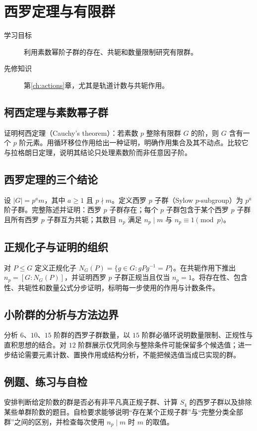 \setcounter{chapter}{6} %
\chapter{西罗定理与有限群}\label{ch:sylow}

\begin{description}
  \item[学习目标] 利用素数幂阶子群的存在、共轭和数量限制研究有限群。
  \item[先修知识] 第\ref{ch:actions}章，尤其是轨道计数与共轭作用。
\end{description}

\section{柯西定理与素数幂子群}
证明柯西定理（Cauchy's theorem）：若素数 $p$ 整除有限群 $G$ 的阶，则 $G$ 含有一个 $p$ 阶元素。用循环移位作用给出一种证明，明确作用集合及其不动点。比较它与拉格朗日定理，说明其结论只处理素数阶而非任意因子阶。

\section{西罗定理的三个结论}
设 $|G|=p^a m$，其中 $a\geq1$ 且 $p\nmid m$。定义西罗 $p$ 子群（Sylow $p$-subgroup）为 $p^a$ 阶子群。完整陈述并证明：西罗 $p$ 子群存在；每个 $p$ 子群包含于某个西罗 $p$ 子群且所有西罗 $p$ 子群互为共轭；其数目 $n_p$ 满足 $n_p\mid m$ 与 $n_p\equiv1\pmod p$。

\section{正规化子与证明的组织}
对 $P\leq G$ 定义正规化子 $N_G(P)=\{g\in G:gPg^{-1}=P\}$。在共轭作用下推出 $n_p=[G:N_G(P)]$，并证明西罗 $p$ 子群正规当且仅当 $n_p=1$。将存在性、包含性、共轭性和数量公式分步证明，标明每一步使用的作用与计数条件。

\section{小阶群的分析与方法边界}
分析 $6$、$10$、$15$ 阶群的西罗子群数量，以 $15$ 阶群必循环说明数量限制、正规性与直积思想的结合。对 $12$ 阶群展示仅凭同余与整除条件可能保留多个候选值；进一步结论需要元素计数、置换作用或结构分析，不能把候选值当成已实现的群。

\section{例题、练习与自检}
安排判断给定阶数的群是否必有非平凡真正规子群、计算 $S_4$ 的西罗子群以及排除某些单群阶数的题目。自检要求能够说明“存在某个正规子群”与“完整分类全部群”之间的区别，并检查每次使用 $n_p\mid m$ 时 $m$ 的取值。

